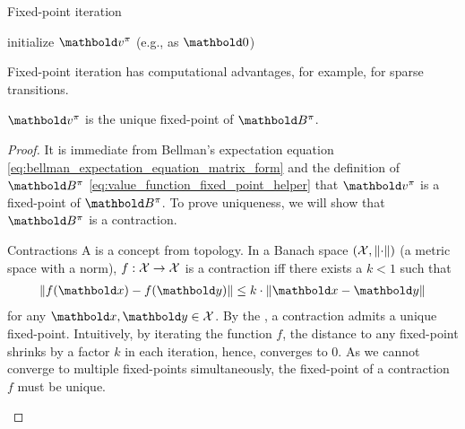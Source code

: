 \begin{algorithm}[H]
  \caption{Fixed-point iteration}\label{alg:fixed_point_iteration}
  initialize $\vv^\pi$ (e.g., as $\vzero$)\;
\end{algorithm}

Fixed-point iteration has computational advantages, for example, for sparse transitions.

\begin{thm}
  $\vv^\pi$ is the unique fixed-point of $\mB^\pi$.
\end{thm}
\begin{proof}
  It is immediate from Bellman's expectation equation \eqref{eq:bellman_expectation_equation_matrix_form} and the definition of $\mB^\pi$ \eqref{eq:value_function_fixed_point_helper} that $\vv^\pi$ is a fixed-point of $\mB^\pi$.
  To prove uniqueness, we will show that $\mB^\pi$ is a contraction.

  \begin{rmk}{Contractions}{}
    A  is a concept from topology.
    In a Banach space $(\spX, \norm{\cdot})$ (a metric space with a norm), $f : \mathcal{X} \to \mathcal{X}$ is a contraction iff there exists a $k < 1$ such that \begin{align}
      \norm{f(\vx) - f(\vy)} \leq k \cdot \norm{\vx - \vy} \label{eq:contraction}
    \end{align} for any $\vx, \vy \in \spX$.
    By the , a contraction admits a unique fixed-point.
    Intuitively, by iterating the function $f$, the distance to any fixed-point shrinks by a factor $k$ in each iteration, hence, converges to $0$.
    As we cannot converge to multiple fixed-points simultaneously, the fixed-point of a contraction $f$ must be unique.
  \end{rmk}


\end{proof}

